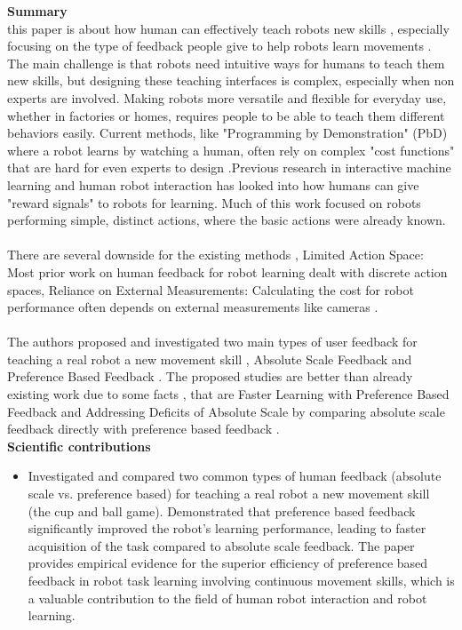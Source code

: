 \documentclass[report.tex]{subfiles}
\begin{document}
\noindent\textbf{Summary} \\
this paper is about how human can effectively teach robots new skills , especially focusing on the
type of feedback people give to help robots learn movements . The main challenge is that robots
need intuitive ways for humans to teach them new skills, but designing these teaching interfaces is
complex, especially when non experts are involved. Making robots more versatile and flexible for
everyday use, whether in factories or homes, requires people to be able to teach them different
behaviors easily. Current methods, like "Programming by Demonstration" (PbD) where a robot
learns by watching a human, often rely on complex "cost functions" that are hard for even experts to
design .Previous research in interactive machine learning and human robot interaction has looked
into how humans can give "reward signals" to robots for learning. Much of this work focused on
robots performing simple, distinct actions, where the basic actions were already known.\\\\
\noindent\textbf{}There are several downside for the existing methods , Limited Action Space: Most prior work on
human feedback for robot learning dealt with discrete action spaces, Reliance on External
Measurements: Calculating the cost for robot performance often depends on external measurements
like cameras .
\\\\
\noindent\textbf{}The authors proposed and investigated two main types of user feedback for teaching a real robot a
new movement skill , Absolute Scale Feedback and Preference Based Feedback . The proposed
studies are better than already existing work due to some facts , that are Faster Learning with
Preference Based Feedback and Addressing Deficits of Absolute Scale by comparing absolute 
scale feedback directly with preference based feedback .\\


\noindent\textbf{Scientific contributions} 
\begin{itemize}
        \item Investigated and compared two common types of human feedback (absolute scale vs.
preference based) for teaching a real robot a new movement skill (the cup and ball game).
        Demonstrated that preference based feedback significantly improved the robot's learning
performance, leading to faster acquisition of the task compared to absolute scale feedback.
    The paper provides empirical evidence for the superior efficiency of preference based
feedback in robot task learning involving continuous movement skills, which is a valuable
contribution to the field of human robot interaction and robot learning.
        
\end{itemize}
\end{document}
